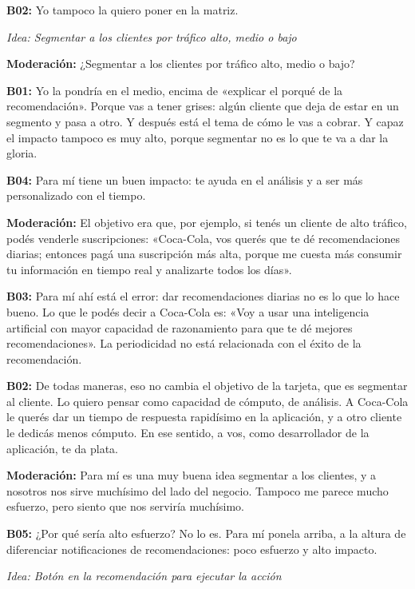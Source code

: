 \noindent\textbf{B02:} Yo tampoco la quiero poner en la matriz.

\medskip\noindent\textit{Idea: Segmentar a los clientes por tráfico alto, medio o bajo}

\noindent\textbf{Moderación:} ¿Segmentar a los clientes por tráfico alto, medio o bajo?

\noindent\textbf{B01:} Yo la pondría en el medio, encima de «explicar el porqué de la recomendación». Porque vas a tener grises: algún cliente que deja de estar en un segmento y pasa a otro. Y después está el tema de cómo le vas a cobrar. Y capaz el impacto tampoco es muy alto, porque segmentar no es lo que te va a dar la gloria.

\noindent\textbf{B04:} Para mí tiene un buen impacto: te ayuda en el análisis y a ser más personalizado con el tiempo.

\noindent\textbf{Moderación:} El objetivo era que, por ejemplo, si tenés un cliente de alto tráfico, podés venderle suscripciones: «Coca-Cola, vos querés que te dé recomendaciones diarias; entonces pagá una suscripción más alta, porque me cuesta más consumir tu información en tiempo real y analizarte todos los días».

\noindent\textbf{B03:} Para mí ahí está el error: dar recomendaciones diarias no es lo que lo hace bueno. Lo que le podés decir a Coca-Cola es: «Voy a usar una inteligencia artificial con mayor capacidad de razonamiento para que te dé mejores recomendaciones». La periodicidad no está relacionada con el éxito de la recomendación.

\noindent\textbf{B02:} De todas maneras, eso no cambia el objetivo de la tarjeta, que es segmentar al cliente. Lo quiero pensar como capacidad de cómputo, de análisis. A Coca-Cola le querés dar un tiempo de respuesta rapidísimo en la aplicación, y a otro cliente le dedicás menos cómputo. En ese sentido, a vos, como desarrollador de la aplicación, te da plata.

\noindent\textbf{Moderación:} Para mí es una muy buena idea segmentar a los clientes, y a nosotros nos sirve muchísimo del lado del negocio. Tampoco me parece mucho esfuerzo, pero siento que nos serviría muchísimo.

\noindent\textbf{B05:} ¿Por qué sería alto esfuerzo? No lo es. Para mí ponela arriba, a la altura de diferenciar notificaciones de recomendaciones: poco esfuerzo y alto impacto.

\medskip\noindent\textit{Idea: Botón en la recomendación para ejecutar la acción}

